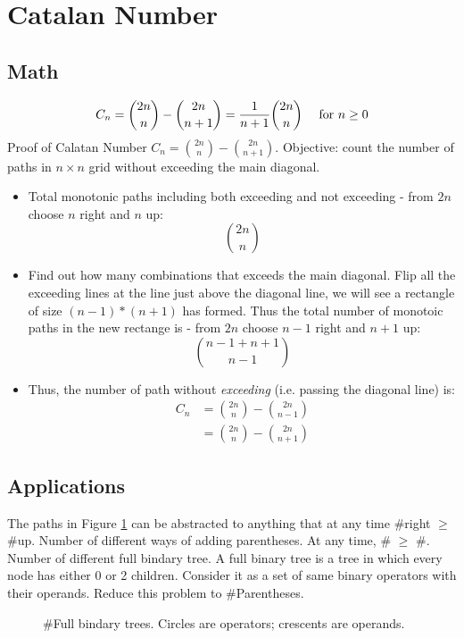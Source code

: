 \section{Catalan Number}\label{section:catalanNumber}
\subsection{Math}
$$
C_n = {2n\choose n} - {2n\choose n+1} = {1\over n+1}{2n\choose n} \quad\text{ for }n\ge 0
$$
 Proof of Calatan Number $C_n ={2n\choose n} - {2n\choose n+1}$. Objective: count the number of paths in $n\times n$ grid without exceeding the main diagonal. 
\begin{itemize}
\begin{figure}[]
    \centerline{\texttt{[image: catalan\_proof]}}
    \caption{Monotonic Paths}
  \label{fig:catalanProof}
\end{figure}
\item Total monotonic paths including both exceeding and not exceeding - from $2n$ choose $n$ right and $n$ up:
$$
{2n\choose n}
$$
\item Find out how many combinations that exceeds the main diagonal. Flip all the exceeding lines at the line just above the diagonal line, we will see a rectangle of size $(n-1) * (n+1)$ has formed. Thus the total number of monotoic paths in the new rectange is - from $2n$ choose $n-1$ right and $n+1$ up:
$$
{n-1+n+1\choose n-1}
$$
\item Thus, the number of path without \textit{exceeding} (i.e. passing the diagonal line) is: 
\begin{align*}
C_n &= {2n\choose n} - {2n\choose n-1}\\ 
&={2n\choose n} - {2n\choose n+1}
\end{align*}
\end{itemize}

\subsection{Applications}
The paths in Figure \ref{fig:catalanProof} can be abstracted to anything that at any time \#right $\geq$ \#up. 
Number of different ways of adding parentheses. At any time, \#\pyinline{(} $\geq$ \#\pyinline{)}.
Number of different full bindary tree. A full binary tree is a tree in which every node has either 0 or 2 children. Consider it as a set of same binary operators with their operands. Reduce this problem to \#Parentheses. 
\begin{figure}[hbtp]
\centering
{}
\caption{\#Full bindary trees. Circles are operators; crescents are operands.}
\label{fig:NumberOfBSTs}
\end{figure}

